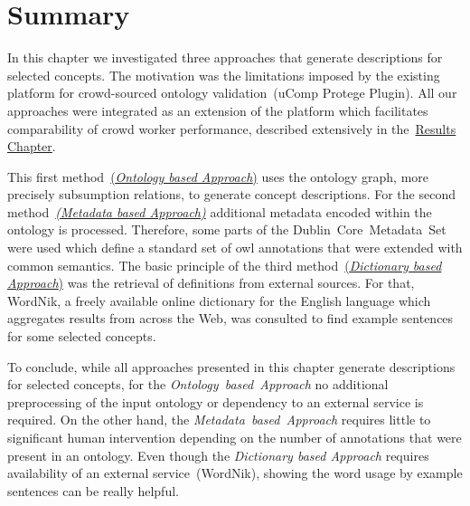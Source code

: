 
\section{Summary}\label{sec:approaches_summary}
In this chapter we investigated three approaches that generate descriptions for selected concepts. The motivation was 
the limitations imposed by the existing platform for crowd-sourced ontology validation~(uComp Protege Plugin). All our approaches
were integrated as an extension of the platform which facilitates comparability of crowd worker performance, described extensively in
the~\hyperref[chap:results]{Results Chapter}. 

This first method~\hyperref[sec:enrichment_ontology_approach]{(\emph{Ontology based Approach})} uses the ontology graph, more precisely
subsumption relations, to generate concept descriptions. For the second method~\hyperref[sec:enrichment_metaData_approach]{\emph{(Metadata
based Approach)}} additional metadata encoded within the ontology is processed. Therefore, some parts of the Dublin~Core~Metadata~Set were used
which define a standard set of \gls{owl} annotations that were extended with common semantics. The basic principle of the third 
method~\hyperref[sec:enrichment_dictionary_approach]{(\emph{Dictionary based Approach})} was the retrieval of definitions from external sources. For that, WordNik, a freely available online dictionary for the English language which aggregates results from across the Web, was consulted to find example sentences for some selected concepts.

To conclude, while all approaches presented in this chapter generate descriptions for selected concepts, for the \emph{Ontology~based~Approach}
no additional preprocessing of the input ontology or dependency to an external service is required. On the other hand, the \emph{Metadata~based~Approach} requires little to significant human intervention depending on the number of annotations that were present in an ontology. Even though the \emph{Dictionary based Approach}
requires availability of an external service~(WordNik), showing the word usage by example sentences can be really helpful.